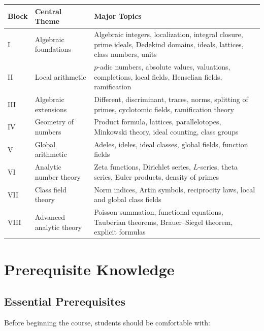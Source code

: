 \documentclass[11pt,a4paper]{article}
\begin{document}
\begin{longtable}{p{}p{}p{}}
\toprule
\textbf{Block} & \textbf{Central Theme} & \textbf{Major Topics} \\
\midrule
I & Algebraic foundations &
Algebraic integers, localization, integral closure, prime ideals,
Dedekind domains, ideals, lattices, class numbers, units \\

II & Local arithmetic &
\(p\)-adic numbers, absolute values, valuations, completions,
local fields, Henselian fields, ramification \\

III & Algebraic extensions &
Different, discriminant, traces, norms, splitting of primes,
cyclotomic fields, ramification theory \\

IV & Geometry of numbers &
Product formula, lattices, parallelotopes, Minkowski theory,
ideal counting, class groups \\

V & Global arithmetic &
Adeles, ideles, ideal classes, global fields, function fields \\

VI & Analytic number theory &
Zeta functions, Dirichlet series, \(L\)-series, theta series,
Euler products, density of primes \\

VII & Class field theory &
Norm indices, Artin symbols, reciprocity laws, local and global
class fields \\

VIII & Advanced analytic theory &
Poisson summation, functional equations, Tauberian theorems,
Brauer--Siegel theorem, explicit formulas
\\
\bottomrule
\end{longtable}

\section{Prerequisite Knowledge}

\subsection{Essential Prerequisites}

Before beginning the course, students should be comfortable with:
\end{document}
